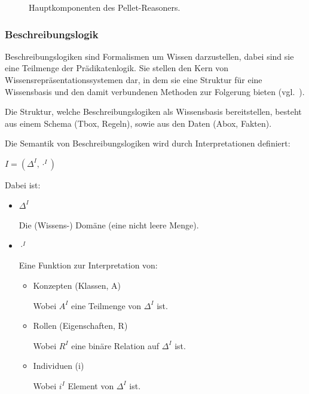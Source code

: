 \begin{figure}[htbp]
\centering {}
\caption{Hauptkomponenten des Pellet-Reasoners.\label{fig:pellet_komponenten}\protect\footnotemark}
\end{figure}

\subsubsection{Beschreibungslogik}
\label{subsubsection:beschreibungslogik}
Beschreibungslogiken sind Formalismen um Wissen darzustellen, dabei sind sie eine Teilmenge der Prädikatenlogik. Sie stellen den Kern von Wissensrepräsentationssystemen dar, in dem sie eine Struktur für eine Wissensbasis und den damit verbundenen Methoden zur Folgerung bieten (vgl.~\cite{dl:baader2003}).

Die Struktur, welche Beschreibungslogiken als Wissensbasis bereitstellen, besteht aus einem Schema (Tbox, Regeln), sowie aus den Daten (Abox, Fakten).

Die Semantik von Beschreibungslogiken wird durch Interpretationen definiert:

\noindent\hspace*{16mm} $ I = (\Delta^I, \cdot^I) $

Dabei ist:
\begin{itemize}
\item $ \Delta^I $

    Die (Wissens-) Domäne (eine nicht leere Menge).

\item $ \cdot^I $

    Eine Funktion zur Interpretation von:
    \begin{itemize}
        \item Konzepten (Klassen, A)

            Wobei $ A^I $ eine Teilmenge von $ \Delta^I $ ist.
        \item Rollen (Eigenschaften, R)

            Wobei $ R^I $ eine binäre Relation auf $ \Delta^I $ ist.
        \item Individuen (i)

            Wobei $ i^I $ Element von $ \Delta^I $ ist.
    \end{itemize}
\end{itemize}

